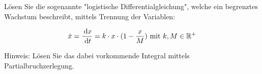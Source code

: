 \item Lösen Sie die sogenannte "logistische Differentialgleichung", welche ein begrenztes Wachstum beschreibt, mittels Trennung der Variablen: 

$$\dot x= \frac{\:\mathrm{d}{x}}{\:\mathrm{d}{t}} = k \cdot x \cdot (1-\frac{x}{M}) \text{ mit } k,M \in \mathbb{R}^{+}$$

Hinweis: Lösen Sie das dabei vorkommende Integral mittels Partialbruchzerlegung.

